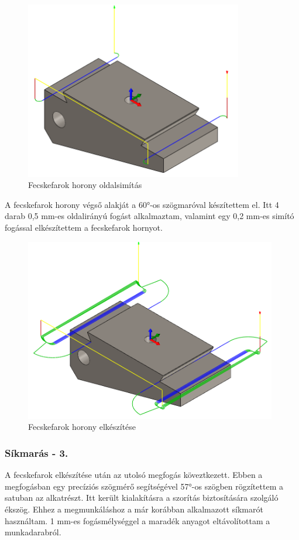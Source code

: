\documentclass[12pt,a4paper,oneside]{report}
\begin{document}
\begin{figure}[H]
    \centering
    \includegraphics[width=9.5cm]{figures/alaptest_dovetail_2.png}
    \caption{Fecskefarok horony oldalsimítás}
    \label{Fig:alaptest_dovetail_2}
\end{figure}

A fecskefarok horony végső alakját a 60°-os szögmaróval készítettem el. Itt 4 darab 0,5 mm-es oldalirányú fogást alkalmaztam, valamint egy 0,2 mm-es simító fogással elkészítettem a fecskefarok hornyot.

\begin{figure}[H]
    \centering
    \includegraphics[width=11cm]{figures/alaptest_dovetail_3.png}
    \caption{Fecskefarok horony elkészítése}
    \label{Fig:alaptest_dovetail_3}
\end{figure}

\subsubsection{Síkmarás - 3.}
A fecskefarok elkészítése után az utolsó megfogás köveztkezett. Ebben a megfogásban egy precíziós szögmérő segítségével 57°-os szögben rögzítettem a satuban az alkatrészt. Itt került kialakításra a szorítás biztosítására szolgáló ékszög. Ehhez a megmunkáláshoz a már korábban alkalmazott síkmarót használtam. 1 mm-es fogásmélységgel a maradék anyagot eltávolítottam a munkadarabról.
\end{document}

